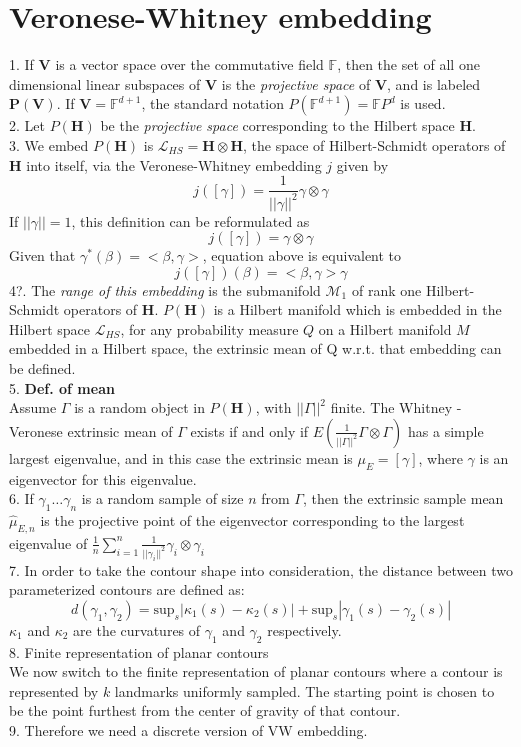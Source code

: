 \documentclass[12pt]{article}
\theoremstyle{definition}
\theoremstyle{remark}
\numberwithin{equation}{section}
\begin{document}
\section{Veronese-Whitney embedding}
1. If $\mathbf{V}$ is a vector space over the commutative field $\mathbb{F}$, then the set of all one dimensional linear subspaces of $\mathbf{V}$ is the \emph{projective space} of $\mathbf{V}$, and is labeled $\mathbf{P(V)}$. If $\mathbf{V} = \mathbb{F}^{d+1}$, the standard notation $P(\mathbb{F}^{d+1}) = \mathbb{F}P^d$ is used. \\[0.2cm]
2. Let $P(\mathbf{H})$ be the \emph{projective space} corresponding to the Hilbert space $\mathbf{H}$.\\[0.2cm]
3. We embed $P(\mathbf{H})$ is $\mathcal{L}_{HS} = \mathbf{H} \otimes \mathbf{H}$, the space of Hilbert-Schmidt operators of $\mathbf{H}$ into itself, via the Veronese-Whitney embedding $j$ given by 
\[j([\gamma]) = \frac{1}{||\gamma||^2} \gamma \otimes \gamma\]
If $||\gamma|| = 1$, this definition can be reformulated as 
\[j([\gamma]) = \gamma \otimes \gamma\]
Given that $\gamma^*(\beta) = <\beta , \gamma>$, equation above is equivalent to
\[j([\gamma])(\beta)= <\beta , \gamma> \gamma\]
4?. The \emph{range of this embedding} is the submanifold $\mathcal{M}_1$ of rank one Hilbert-Schmidt operators of $\mathbf{H}$.  $P(\mathbf{H})$ is a Hilbert manifold which is embedded in the Hilbert space $\mathcal{L}_{HS}$, for any probability measure $Q$ on a Hilbert manifold $M$ embedded in a Hilbert space, the extrinsic mean of Q w.r.t. that embedding can be defined. \\[0.2cm]
5. \textbf{Def. of mean} \\[0.2cm]
Assume $\Gamma$ is a random object in $P(\mathbf{H})$, with $||\Gamma||^2$ finite. The Whitney -Veronese extrinsic mean of $\Gamma$ exists if and only if $E(\frac{1}{||\Gamma||^2}\Gamma \otimes \Gamma)$ has a simple largest eigenvalue, and in this case the extrinsic mean is $\mu_E = [\gamma]$, where $\gamma$ is an eigenvector for this eigenvalue.\\[0.2cm]
6. If $\gamma_1 \dots \gamma_n$ is a random sample of size $n$ from $\Gamma$, then the extrinsic sample mean $\hat{\mu}_{E,n}$ is the projective point of the eigenvector corresponding to the largest eigenvalue of $\frac{1}{n}\sum_{i=1}^{n}\frac{1}{||\gamma_i||^2}\gamma_i \otimes \gamma_i$ \\[0.2cm]
7. In order to take the contour shape into consideration, the distance between two parameterized contours are defined as:
\[d(\gamma_1, \gamma_2) = \text{sup}_s|\kappa_1(s)-\kappa_2(s)|+\text{sup}_s|\gamma_1(s)-\gamma_2(s)|\] 
$\kappa_1$ and $\kappa_2$ are the curvatures of $\gamma_1$ and $\gamma_2$ respectively. \\[0.2cm]
8. Finite representation of planar contours\\[0.2cm]
We now switch to the finite representation of planar contours where a contour is represented by $k$ landmarks uniformly sampled. The starting point is chosen to be the point furthest from the center of gravity of that contour. \\[0.2cm]
9. Therefore we need a discrete version of VW embedding. \\[0.2cm]
\end{document}
